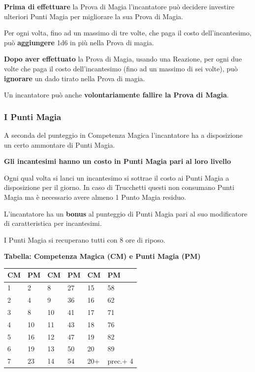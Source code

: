 \begin{multicols}{2}
\textbf{Prima di effettuare} la Prova di Magia l'incantatore può decidere investire ulteriori Punti Magia per migliorare la sua Prova di Magia.

Per ogni volta, fino ad un massimo di tre volte, che paga il costo dell'incantesimo, può \textbf{aggiungere} 1d6 in più nella Prova di magia. 

\textbf{Dopo aver effettuato} la Prova di Magia, usando una Reazione, per ogni due volte che paga il costo dell'incantesimo (fino ad un massimo di sei volte), può \textbf{ignorare} un dado tirato nella Prova di magia. 

Un incantatore può anche \textbf{volontariamente fallire la Prova di Magia}.


\subsubsection{I Punti Magia}\label{magiepuntimagia}\hypertarget{magiepuntimagia}{}

A seconda del punteggio in Competenza Magica l'incantatore ha a disposizione un certo ammontare di Punti Magia.

\textbf{Gli incantesimi hanno un costo in Punti Magia pari al loro livello}


Ogni qual volta si lanci un incantesimo si sottrae il costo ai Punti Magia a disposizione per il giorno.
In caso di Trucchetti questi non consumano Punti Magia ma è necessario avere almeno 1 Punto Magia residuo.

L'incantatore ha un \textbf{bonus} al punteggio di Punti Magia pari al suo modificatore di caratteristica per incantesimi.

I Punti Magia si recuperano tutti con 8 ore di riposo. 

\medskip

\textbf{Tabella: Competenza Magica (CM) e Punti Magia (PM)}

\medskip

\noindent\begin{tabularx}{0.45\textwidth}{XX|XX|XX}
\textbf{CM} & \textbf{PM}&\textbf{CM} & \textbf{PM}&\textbf{CM} & \textbf{PM}\\
\hline
1&2 &8&27&15&58\\
2&4&9&36&16&62\\
3&8&10&41&17&71\\
4&10&11&43&18&76\\
5&16&12&47&19&82\\
6&19&13&50&20&89\\
7&23&14&54&20+&prec.+ 4
\end{tabularx}


\end{multicols}

